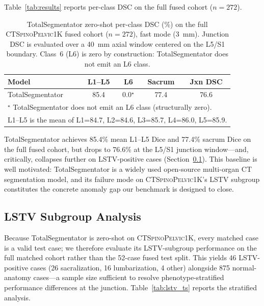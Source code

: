 \documentclass[pmlr]{jmlr}
\newcommand{\dataset}{\textsc{CTSpinoPelvic1K}}
\begin{document}
Table~\ref{tab:results} reports per-class DSC on the full fused
cohort ($n=272$).

\begin{table}[t]
  {\caption{TotalSegmentator zero-shot per-class DSC (\%) on the
    full \dataset{} fused cohort ($n=272$), fast mode (3~mm).
    Junction DSC is evaluated over a 40~mm axial window centered
    on the L5/S1 boundary. Class~6 (L6) is zero by construction:
    TotalSegmentator does not emit an L6 class.}}
  {\small\begin{tabular}{lcccc}
  \toprule
  \bfseries Model & \bfseries L1--L5 & \bfseries L6
    & \bfseries Sacrum & \bfseries Jxn DSC \\
  \midrule
  TotalSegmentator & 85.4 & \phantom{0}0.0$^\star$ & 77.4 & 76.6 \\
  \midrule
  \multicolumn{5}{l}{\footnotesize
    $^\star$ TotalSegmentator does not emit an L6 class
    (structurally zero).}\\
  \multicolumn{5}{l}{\footnotesize
    L1--L5 is the mean of L1=84.7, L2=84.6, L3=85.7, L4=86.0,
    L5=85.9.}\\
  \bottomrule
  \end{tabular}}
\end{table}

TotalSegmentator achieves 85.4\% mean L1--L5 Dice and 77.4\%
sacrum Dice on the full fused cohort, but drops to 76.6\% at the
L5/S1 junction window---and, critically, collapses further on
LSTV-positive cases (Section~\ref{sec:lstv_subgroup}).
This baseline is well motivated: TotalSegmentator is a widely used
open-source multi-organ CT segmentation model, and its failure mode
on \dataset{}'s LSTV subgroup constitutes the concrete anomaly gap
our benchmark is designed to close.

\subsection{LSTV Subgroup Analysis}
\label{sec:lstv_subgroup}

Because TotalSegmentator is zero-shot on \dataset{}, every matched
case is a valid test case; we therefore evaluate its LSTV-subgroup
performance on the full matched cohort rather than the 52-case
fused test split.
This yields 46 LSTV-positive cases (26 sacralization,
16 lumbarization, 4 other) alongside 875 normal-anatomy cases---a
sample size sufficient to resolve phenotype-stratified performance
differences at the junction.
Table~\ref{tab:lstv_ts} reports the stratified analysis.
\end{document}
